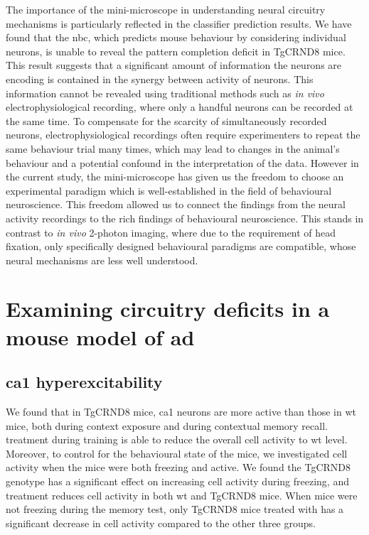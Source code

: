 The importance of the mini-microscope in understanding neural circuitry mechanisms is particularly reflected in the classifier prediction results. We have found that the \gls{nbc}, which predicts mouse behaviour by considering individual neurons, is unable to reveal the pattern completion deficit in TgCRND8 mice. This result suggests that a significant amount of information the neurons are encoding is contained in the synergy between activity of neurons. This information cannot be revealed using traditional methods such as \textit{in vivo} electrophysiological recording, where only a handful neurons can be recorded at the same time. To compensate for the scarcity of simultaneously recorded neurons, electrophysiological recordings often require experimenters to repeat the same behaviour trial many times, which may lead to changes in the animal's behaviour and a potential confound in the interpretation of the data. However in the current study, the mini-microscope has given us the freedom to choose an experimental paradigm which is well-established in the field of behavioural neuroscience. This freedom allowed us to connect the findings from the neural activity recordings to the rich findings of behavioural neuroscience. This stands in contrast to \textit{in vivo} 2-photon imaging, where due to the requirement of head fixation, only specifically designed behavioural paradigms are compatible, whose neural mechanisms are less well understood. 


\section{Examining circuitry deficits in a mouse model of \gls{ad}}

\subsection{\gls{ca1} hyperexcitability}
We found that in TgCRND8 mice, \gls{ca1} neurons are more active than those in \gls{wt} mice, both during context exposure and during contextual memory recall. \tglu{} treatment during training is able to reduce the overall cell activity to \gls{wt} level. Moreover, to control for the behavioural state of the mice, we investigated cell activity when the mice were both freezing and active. We found the TgCRND8 genotype has a significant effect on increasing cell activity during freezing, and \tglu{} treatment reduces cell activity in both \gls{wt} and TgCRND8 mice. When mice were not freezing during the memory test, only TgCRND8 mice treated with \tglu{} has a significant decrease in cell activity compared to the other three groups. 

